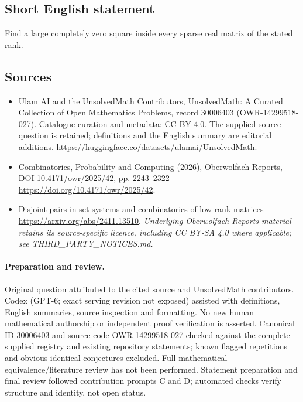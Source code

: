 \documentclass[11pt]{article}
\begin{document}
\subsection{Short English statement}
Find a large completely zero square inside every sparse real matrix of the stated rank.
\subsection{Sources}
\begin{itemize}
\item[\hypertarget{source:30006403:1}{S1}] Ulam AI and the UnsolvedMath Contributors, UnsolvedMath: A Curated Collection of Open Mathematics Problems, record 30006403 (OWR-14299518-027). Catalogue curation and metadata: CC BY 4.0. The supplied source question is retained; definitions and the English summary are editorial additions.
\url{https://huggingface.co/datasets/ulamai/UnsolvedMath}.
\item[\hypertarget{source:30006403:2}{S2}] Combinatorics, Probability and Computing (2026), Oberwolfach Reports, DOI 10.4171/owr/2025/42, pp. 2243--2322
\url{https://doi.org/10.4171/owr/2025/42}.
\item[\hypertarget{source:30006403:3}{S3}] Disjoint pairs in set systems and combinatorics of low rank matrices
\url{https://arxiv.org/abs/2411.13510}.
\textit{Underlying Oberwolfach Reports material retains its source-specific licence, including CC BY-SA 4.0 where applicable; see THIRD\_PARTY\_NOTICES.md.}
\end{itemize}
\paragraph{Preparation and review.}
Original question attributed to the cited source and UnsolvedMath contributors. Codex (GPT-6; exact serving revision not exposed) assisted with definitions, English summaries, source inspection and formatting. No new human mathematical authorship or independent proof verification is asserted. Canonical ID 30006403 and source code OWR-14299518-027 checked against the complete supplied registry and existing repository statements; known flagged repetitions and obvious identical conjectures excluded. Full mathematical-equivalence/literature review has not been performed. Statement preparation and final review followed contribution prompts C and D; automated checks verify structure and identity, not open status.
\label{end:30006403}
\end{document}
